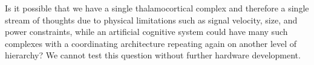\vspace{3em}
Is it possible that we have a single thalamocortical complex and therefore a single stream of thoughts due to physical limitations such as signal velocity, size, and power constraints, while an artificial cognitive system could have many such complexes with a coordinating architecture repeating again on another level of hierarchy? We cannot test this question without further hardware development.

